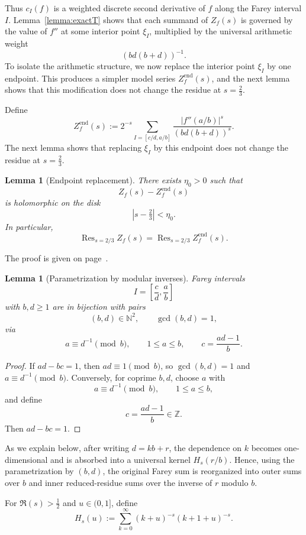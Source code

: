 \documentclass[a4paper,american,11pt]{amsart}
\theoremstyle{plain}
\newtheorem{lemma}[theorem]{Lemma}
\theoremstyle{definition}
\newcommand{\N}{\mathbb N}
\newcommand{\Z}{\mathbb Z}
\DeclareMathOperator*{\Res}{Res}
\begin{document}
Thus \(c_I(f)\) is a weighted discrete second derivative of \(f\) along the
Farey interval \(I\). Lemma~\ref{lemma:exactT} shows that each summand of
\(Z_f(s)\) is governed by the value of \(f''\) at some interior point
\(\xi_I\), multiplied by the universal arithmetic weight
\[
(bd(b+d))^{-1}.
\]
To isolate the arithmetic structure, we now replace the interior point
\(\xi_I\) by one endpoint. This produces a simpler model series
\(Z_f^{\mathrm{end}}(s)\), and the next lemma shows that this modification
does not change the residue at \(s=\frac23\).

Define
\[
Z_f^{\mathrm{end}}(s)
:=
2^{-s}
\sum_{I=[c/d,a/b]}
\frac{|f''(a/b)|^s}{(bd(b+d))^s}.
\]
The next lemma shows that replacing \(\xi_I\) by this endpoint does not
change the residue at \(s=\frac23\).

\begin{lemma}[Endpoint replacement]
\label{lem:replace}
There exists \(\eta_0>0\) such that
\[
Z_f(s)-Z_f^{\mathrm{end}}(s)
\]
is holomorphic on the disk
\[
|s-\tfrac23|<\eta_0.
\]
In particular,
\[
\Res_{s=2/3}Z_f(s)=\Res_{s=2/3}Z_f^{\mathrm{end}}(s).
\]
\end{lemma}

The proof is given on page~\pageref{proof:lem:replace}.

\begin{lemma}[Parametrization by modular inverses]
\label{lem:param}
Farey intervals
\[
I=\left[\frac cd,\frac ab\right]
\]
with \(b,d\ge1\) are in bijection with pairs
\[
(b,d)\in\N^2,
\qquad
\gcd(b,d)=1,
\]
via
\[
a\equiv d^{-1}\pmod b,
\qquad
1\le a\le b,
\qquad
c=\frac{ad-1}{b}.
\]
\end{lemma}

\begin{proof}
If \(ad-bc=1\), then \(ad\equiv1\pmod b\), so \(\gcd(b,d)=1\) and
\(a\equiv d^{-1}\pmod b\). Conversely, for coprime \(b,d\), choose \(a\)
with
\[
a\equiv d^{-1}\pmod b,
\qquad
1\le a\le b,
\]
and define
\[
c=\frac{ad-1}{b}\in\Z.
\]
Then \(ad-bc=1\).
\end{proof}

As we explain below, after writing \(d=kb+r\), the dependence on \(k\)
becomes one-dimensional and is absorbed into a universal kernel
\(H_s(r/b)\). Hence, using the parametrization by \((b,d)\), the original
Farey sum is reorganized into outer sums over \(b\) and inner reduced-residue
sums over the inverse of \(r\) modulo \(b\).

For \(\Re(s)>\frac12\) and \(u\in(0,1]\), define
\[
H_s(u):=\sum_{k=0}^\infty (k+u)^{-s}(k+1+u)^{-s}.
\]
\end{document}
